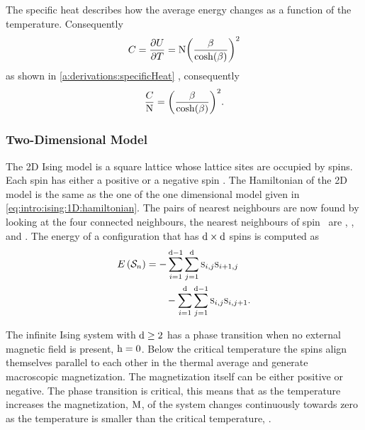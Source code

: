 	The specific heat describes how the average energy changes as a function of the temperature. Consequently
	\begin{equation*}
		C = \frac{\partial U}{\partial T} = \mathrm{N} {\left(\frac{\beta}{\cosh(\beta)}\right)}^{2}
	\end{equation*}
	as shown in \cref{a:derivations:specificHeat} \cite{warkHandout}, consequently
	\begin{equation*}
	 	\frac{C}{\mathrm{N}} = {\left(\frac{\beta}{\cosh(\beta)}\right)}^2.
	 \end{equation*}
 
\subsubsection{Two-Dimensional Model}
	\label{sss:intro:ising:2D}
	The 2D Ising model is a square lattice whose lattice sites are occupied by spins. Each spin has either a positive or a negative spin \cite{kenzel1997physics}. The Hamiltonian of the 2D model is the same as the one of the one dimensional model given in \cref{eq:intro:ising:1D:hamiltonian}. The pairs of nearest neighbours are now found by looking at the four connected neighbours, \ie the nearest neighbours of \mbox{spin } are , ,  and . The energy of a configuration  that has $\mathrm{d} \times \mathrm{d}$ spins is computed as
	\begin{equation}
		\label{eq:intro:ising:2d:energy}
		\begin{split}
		E\left(\mathcal{S}_{n} \right) 
			& = - \sum_{i = 1}^{\mathrm{d} - 1}\sum_{j = 1}^{\mathrm{d}} \textsc{s}_{i,j}\textsc{s}_{i+1,j}\\
			&\quad\quad - \sum_{i = 1}^{\mathrm{d}}\sum_{j = 1}^{\mathrm{d} - 1} \textsc{s}_{i,j} \textsc{s}_{i, j+1}.
		\end{split}
	\end{equation}

	The infinite Ising system with $\mathrm{d} \geq 2$ has a phase transition when no external magnetic field is present, \ie $\mathrm{h} = 0$. Below the critical temperature \criticalTemperature the spins align themselves parallel to each other in the thermal average and generate macroscopic magnetization. The magnetization itself can be either positive or negative. The phase transition is critical, this means that as the temperature increases the magnetization, $\mathrm{M}$, of the system changes continuously towards zero as the temperature is smaller than the critical temperature, \criticalTemperature. 

